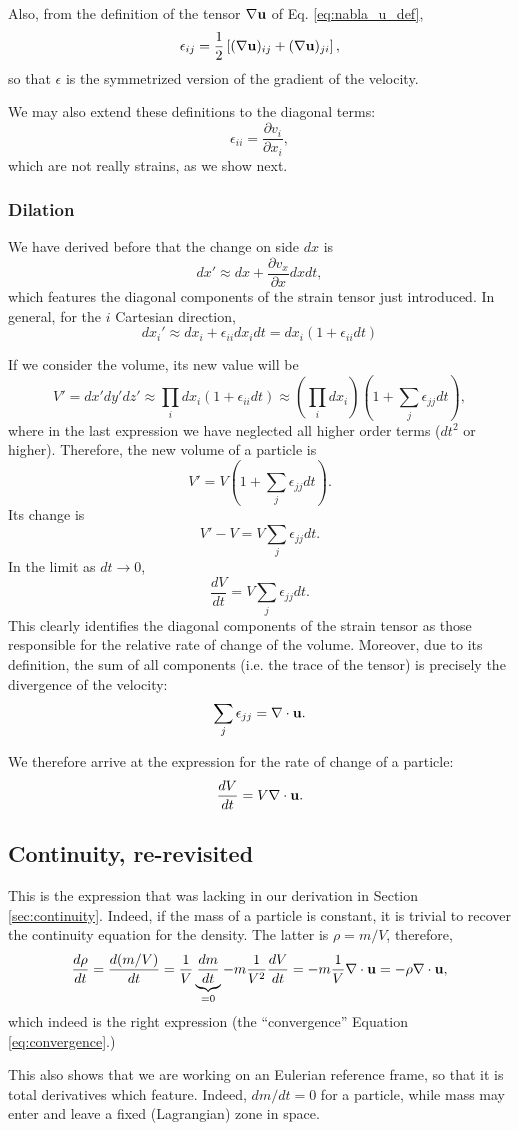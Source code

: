 Also, from the definition of the tensor $\nabla \mathbf{u}$ of
Eq. \ref{eq:nabla_u_def},
\[
\epsilon_{ij} = \frac12
\left[
 (\nabla \mathbf{u})_{ij} +
 (\nabla \mathbf{u})_{ji}
\right] ,
\]
so that $\epsilon$ is the symmetrized version of the gradient of the
velocity.

We may also extend these definitions to the diagonal terms:
\[
  \epsilon_{ii} =   \frac{\partial v_i}{\partial x_i} ,
\]
which are not really strains, as we show next.

\subsubsection{Dilation}

We have derived before that the change on side $dx$ is
\[
dx' \approx  dx + \frac{\partial v_x}{\partial x} dx dt ,
\]
which features the diagonal components of the strain tensor just
introduced. In general, for the $i$ Cartesian direction,
\[
dx_i' \approx dx_i + \epsilon_{ii} dx_i dt = dx_i
\left(
1+\epsilon_{ii} dt
\right)
\]

If we consider the volume, its new value will be
\[
V'= dx' dy' dz'  \approx  \prod_i  dx_i \left( 1+\epsilon_{ii} dt \right)
\approx \left(\prod_i  dx_i \right) \left( 1 + \sum_j  \epsilon_{jj} dt \right) ,
\]
where in the last expression we have neglected all higher order terms
($dt^2$ or higher). Therefore, the new volume of a particle is
\[
V' = V \left( 1 + \sum_j  \epsilon_{jj} dt \right) .
\]
Its change is
\[
V'-V =  V \sum_j  \epsilon_{jj} dt .
\]
In the limit as $dt\to 0$,
\[
\frac{d V}{dt} = V \sum_j  \epsilon_{jj} dt .
\]
This clearly identifies the diagonal components of the strain tensor
as those responsible for the relative rate of change of the volume.
Moreover, due to its definition, the sum of all components (i.e. the
trace of the tensor) is precisely the divergence of the velocity:
\[
\sum_j  \epsilon_{jj} = \nabla\cdot \mathbf{u} .
\]

We therefore arrive at the expression for the rate of change of a particle:
\[
\frac{d V}{dt} = V  \nabla\cdot \mathbf{u} .
\]

\subsection{Continuity, re-revisited}
\label{sec:continuity3}

This is the expression that was lacking in our derivation in
Section \ref{sec:continuity}. Indeed, if the mass of a particle is
constant, it is trivial to recover the continuity equation for the
density. The latter is $\rho=m/V$, therefore,
\[
\frac{d \rho }{dt} =
\frac{d (m/V) }{dt} = \frac1V \underbrace{\frac{ dm }{dt}}_{=0} -
m\frac1{V^2}  \frac{ dV }{dt } =
- m\frac1{V}  \nabla\cdot \mathbf{u}  = -\rho \nabla\cdot \mathbf{u} ,
\]
which indeed is the right expression (the ``convergence'' Equation
\ref{eq:convergence}.)

This also shows that we are working on an Eulerian reference frame, so
that it is total derivatives which feature. Indeed, $dm/dt=0$ for a
particle, while mass may enter and leave a fixed (Lagrangian) zone in
space.

